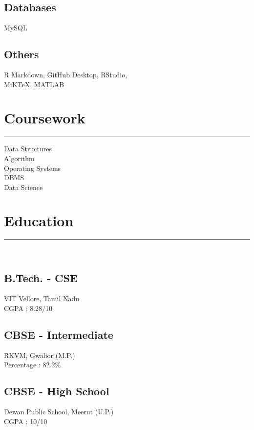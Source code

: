 \documentclass[]{meetresume-class}
\begin{document}
\begin{minipage}[t]{0.33\textwidth}
		\subsection{Databases}
		MySQL%
		\vspace{6pt}
		
		\subsection{Others}
		R Markdown, GitHub Desktop, RStudio,\\
		MiKTeX, MATLAB%
		\sectionsep
		\section{Coursework}
		\noindent\rule{5cm}{0.6pt}
		
		Data Structures\\
		Algorithm\\
		Operating Systems\\
		DBMS\\
		Data Science
		\sectionsep
		\section{Education} 
		\noindent\rule{5cm}{0.6pt}\\
		\subsection{B.Tech. - CSE}
		VIT Vellore, Tamil Nadu \\
		CGPA : 8.28/10\\
		\vspace{8pt}
		\subsection{CBSE - Intermediate}
		RKVM, Gwalior (M.P.)\\
		Percentage : 82.2\%\\
		\vspace{8pt}
		\subsection{CBSE - High School}
		Dewan Public School, Meerut (U.P.)\\
		CGPA : 10/10
		\sectionsep

\end{minipage}
\end{document}
